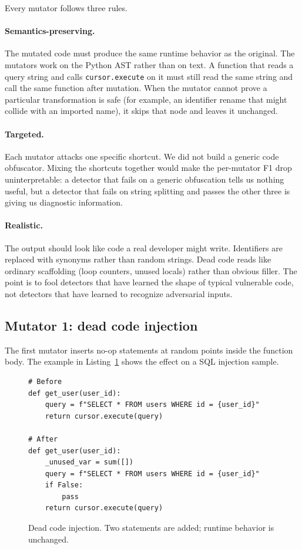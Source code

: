 Every mutator follows three rules.

\paragraph{Semantics-preserving.} The mutated code must produce the
same runtime behavior as the original. The mutators work on the Python
AST rather than on text. A function that reads a query string and
calls \texttt{cursor.execute} on it must still read the same string
and call the same function after mutation. When the mutator cannot
prove a particular transformation is safe (for example, an identifier
rename that might collide with an imported name), it skips that node
and leaves it unchanged.

\paragraph{Targeted.} Each mutator attacks one specific shortcut. We
did not build a generic code obfuscator. Mixing the shortcuts together
would make the per-mutator F1 drop uninterpretable: a detector that
fails on a generic obfuscation tells us nothing useful, but a detector
that fails on string splitting and passes the other three is giving us
diagnostic information.

\paragraph{Realistic.} The output should look like code a real
developer might write. Identifiers are replaced with synonyms rather
than random strings. Dead code reads like ordinary scaffolding (loop
counters, unused locals) rather than obvious filler. The point is to
fool detectors that have learned the shape of typical vulnerable code,
not detectors that have learned to recognize adversarial inputs.

\subsection{Mutator 1: dead code injection}
\label{sec:method:deadcode}

The first mutator inserts no-op statements at random points inside the
function body. The example in Listing~\ref{lst:deadcode} shows the
effect on a SQL injection sample.

\begin{figure}[h]
\begin{verbatim}
# Before
def get_user(user_id):
    query = f"SELECT * FROM users WHERE id = {user_id}"
    return cursor.execute(query)

# After
def get_user(user_id):
    _unused_var = sum([])
    query = f"SELECT * FROM users WHERE id = {user_id}"
    if False:
        pass
    return cursor.execute(query)
\end{verbatim}
\caption{Dead code injection. Two statements are added; runtime
behavior is unchanged.}
\label{lst:deadcode}
\end{figure}

